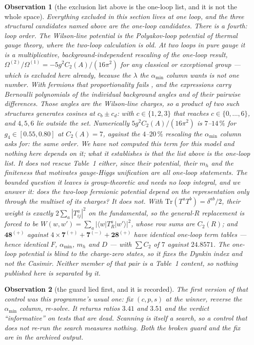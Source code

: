 \documentclass[11pt,a4paper]{article}
\newtheorem{observation}{Observation}
\newcommand{\rep}[1]{\mathbf{#1}}
\newcommand{\amin}{\alpha_{\min}}
\begin{document}
\begin{observation}[the exclusion list above is the one-loop list, and it is not the whole space]
\label{obs:looporder}
Everything excluded in this section lives at one loop, and the three structural candidates named
above are the one-loop candidates. There is a fourth: \emph{loop order}. The Wilson-line potential is
the Polyakov-loop potential of thermal gauge theory, where the two-loop calculation is old. At two
loops in pure gauge it is a multiplicative, background-independent rescaling of the one-loop result,
$\Omega^{(2)}/\Omega^{(1)}=-5g^2C_2(A)/(16\pi^2)$ for any classical or exceptional group
\cite{DGKA} --- which is excluded here already, because the $\lambda$ the $\amin$ column wants is not
one number. With fermions that proportionality fails \cite{GuoDu}, and the expressions carry
Bernoulli polynomials of the individual background angles \emph{and of their pairwise differences}.
Those angles are the Wilson-line charges, so a product of two such structures generates cosines at
$c_b\pm c_d$: with $c\in\{1,2,3\}$ that reaches $c\in\{0,\dots,6\}$, and $4,5,6$ lie outside the set.
Numerically $5g^2C_2(A)/(16\pi^2)$ is $7$--$14\,\%$ for $g_4\in[0.55,0.80]$ at $C_2(A)=7$, against
the $4$--$20\,\%$ rescaling the $\amin$ column asks for: \emph{the same order}. We have not computed
this term for this model and nothing here depends on it; what it establishes is that the list above
is the one-loop list. It does not rescue Table~1 either, since their potential, their $m_h$ and the
finiteness that motivates gauge-Higgs unification are all one-loop statements. The bounded question
it leaves is group-theoretic and needs no loop integral, and we answer it: \emph{does the two-loop
fermionic potential depend on the representation only through the multiset of its charges?} It does
not. With $\mathrm{Tr}(T^aT^b)=\delta^{ab}/2$, their weight is exactly $2\sum_a|T^a_{ij}|^2$ on the
fundamental, so the general-$R$ replacement is forced to be
$W(w,w')=\sum_a|\langle w|T^a_R|w'\rangle|^2$, whose row sums are $C_2(R)$; and
$\rep{48}^{(+)}$ against $4\times\rep7^{(+)}+\rep7^{(-)}+\rep{28}^{(+)}$ have identical one-loop
term tables --- hence identical $F$, $\amin$, $m_h$ and $D$ --- with $\sum C_2$ of $7$ against
$24.8571$. The one-loop potential is blind to the charge-zero states, so it fixes the Dynkin index
and not the Casimir. Neither member of that pair is a Table~1 content, so nothing published here is
separated by it.
\end{observation}

\begin{observation}[the guard lied first, and it is recorded]
The first version of that control was this programme's usual one: fix $(c,p,s)$ at the winner,
reverse the $\amin$ column, re-solve. It returns ratios $3.41$ and $3.51$ and the verdict
``informative'' on tests that are dead. Scanning is itself a search, so a control that does not
re-run the search measures nothing. Both the broken guard and the fix are in the archived output.
\end{observation}
\end{document}
